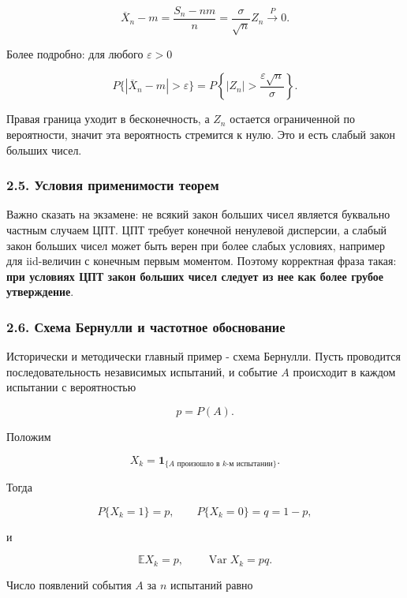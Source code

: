 \documentclass[
  11pt,
  a4paper,
]{article}
\begin{document}
\[
\overline X_n-m
=
\frac{S_n-nm}{n}
=
\frac{\sigma}{\sqrt n}Z_n
\xrightarrow{P}0.
\]

Более подробно: для любого \(\varepsilon>0\)

\[
P\{|\overline X_n-m|>\varepsilon\}
=
P\left\{|Z_n|>\frac{\varepsilon\sqrt n}{\sigma}\right\}.
\]

Правая граница уходит в бесконечность, а \(Z_n\) остается ограниченной
по вероятности, значит эта вероятность стремится к нулю. Это и есть
слабый закон больших чисел.

\subsubsection{2.5. Условия применимости
теорем}\label{ux443ux441ux43bux43eux432ux438ux44f-ux43fux440ux438ux43cux435ux43dux438ux43cux43eux441ux442ux438-ux442ux435ux43eux440ux435ux43c}

Важно сказать на экзамене: не всякий закон больших чисел является
буквально частным случаем ЦПТ. ЦПТ требует конечной ненулевой дисперсии,
а слабый закон больших чисел может быть верен при более слабых условиях,
например для iid-величин с конечным первым моментом. Поэтому корректная
фраза такая: \textbf{при условиях ЦПТ закон больших чисел следует из нее
как более грубое утверждение}.

\subsubsection{2.6. Схема Бернулли и частотное
обоснование}\label{ux441ux445ux435ux43cux430-ux431ux435ux440ux43dux443ux43bux43bux438-ux438-ux447ux430ux441ux442ux43eux442ux43dux43eux435-ux43eux431ux43eux441ux43dux43eux432ux430ux43dux438ux435}

Исторически и методически главный пример - схема Бернулли. Пусть
проводится последовательность независимых испытаний, и событие \(A\)
происходит в каждом испытании с вероятностью

\[
p=P(A).
\]

Положим

\[
X_k=\mathbf 1_{\{A\text{ произошло в }k\text{-м испытании}\}}.
\]

Тогда

\[
P\{X_k=1\}=p,
\qquad
P\{X_k=0\}=q=1-p,
\]

и

\[
\mathbb EX_k=p,
\qquad
\operatorname{Var}X_k=pq.
\]

Число появлений события \(A\) за \(n\) испытаний равно
\end{document}
